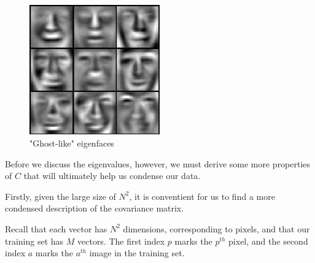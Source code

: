 \documentclass[12pt]{report}
\begin{document}
            \begin{figure}[H]
                \centering
                \includegraphics[width=0.5\textwidth]{eigenfaces.jpg}
                \caption{"Ghost-like" eigenfaces \cite{Dusenberry2015}}
            \end{figure}

            Before we discuss the eigenvalues, however, we must derive some more properties of $C$ that will ultimately help us condense our data.

            Firstly, given the large size of $N^2$, it is conventient for us to find a more condensed description of the covariance matrix.


            Recall that each vector has $N^2$ dimensions, corresponding to pixels, and that our training set has $M$ vectors. The first index $p$ marks the $p^{th}$ pixel, and the second index $a$ marks the $a^{th}$ image in the training set. 
\end{document}
